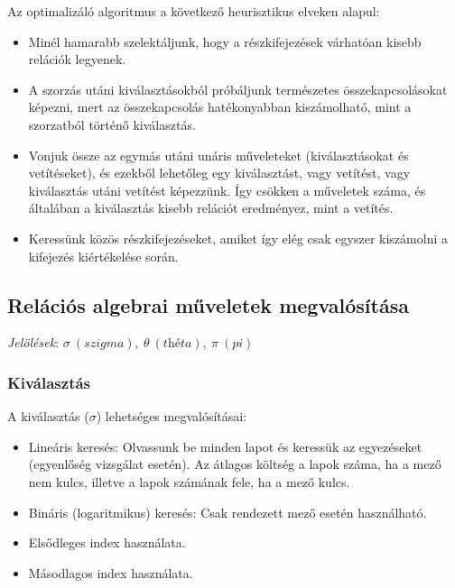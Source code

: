 \documentclass[12pt,margin=0px]{article}
\begin{document}
	\noindent Az optimalizáló algoritmus a következő heurisztikus elveken alapul:
	\begin{itemize}
		\item Minél hamarabb szelektáljunk, hogy a részkifejezések várhatóan kisebb relációk legyenek.
		\item A szorzás utáni kiválasztásokból próbáljunk természetes összekapcsolásokat képezni, mert az összekapcsolás hatékonyabban kiszámolható, mint a szorzatból történő kiválasztás.
        \item Vonjuk össze az egymás utáni unáris műveleteket (kiválasztásokat és vetítéseket), és ezekből lehetőleg egy kiválasztást, vagy vetítést, vagy kiválasztás utáni vetítést képezzünk. Így csökken a műveletek száma, és általában a kiválasztás kisebb relációt eredményez, mint a vetítés.
		\item Keressünk közös részkifejezéseket, amiket így elég csak egyszer kiszámolni a kifejezés kiértékelése során.
	\end{itemize}
\newpage
	\subsection*{Relációs algebrai műveletek megvalósítása}

    \noindent \emph{Jelölések}: $\sigma\ (\textit{szigma}),\ \theta\ (\textit{théta}),\ \pi\ (\textit{pi})$
	
	\subsubsection*{Kiválasztás}
	
	A kiválasztás ($\sigma$) lehetséges megvalósításai:

	\begin{itemize}
		\item	Lineáris keresés: Olvassunk be minden lapot és keressük az egyezéseket (egyenlőség vizsgálat esetén).
		Az átlagos költség a lapok száma, ha a mező nem kulcs, illetve a lapok számának fele, ha a mező kulcs.
		\item	Bináris (logaritmikus) keresés: Csak rendezett mező esetén használható.
		\item	Elsődleges index használata.
		\item	Másodlagos index használata.
	\end{itemize}
\end{document}
